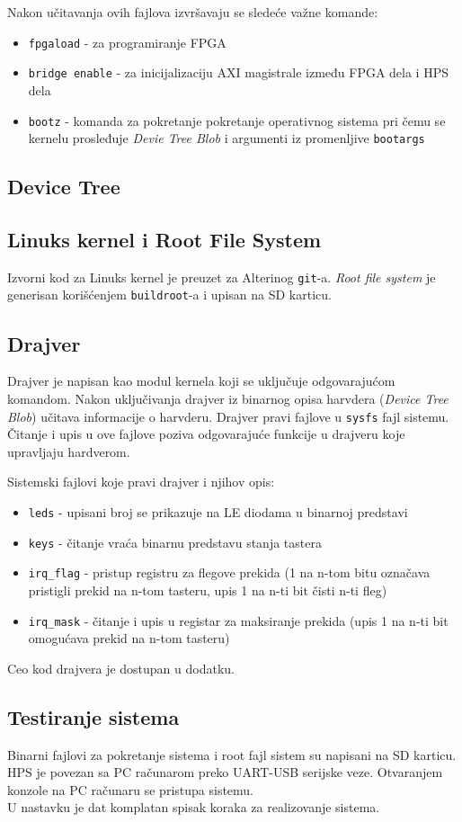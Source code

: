 Nakon učitavanja ovih fajlova izvršavaju se sledeće važne komande:
\begin{itemize}
\item \texttt{fpgaload} - za programiranje FPGA
\item \texttt{bridge enable} - za inicijalizaciju AXI magistrale između FPGA dela i HPS dela
\item \texttt{bootz} - komanda za pokretanje pokretanje operativnog sistema pri čemu se kernelu prosleđuje \textit{Devie Tree Blob} i argumenti iz promenljive \texttt{bootargs}
\end{itemize}

\subsection{Device Tree}

\subsection{Linuks kernel i Root File System}
Izvorni kod za Linuks kernel je preuzet za Alterinog \texttt{git}-a. \textit{Root file system} je generisan korišćenjem \texttt{buildroot}-a i upisan na SD karticu.

\subsection{Drajver}
Drajver je napisan kao modul kernela koji se uključuje odgovarajućom komandom. Nakon uključivanja drajver iz binarnog opisa harvdera (\textit{Device Tree Blob}) učitava informacije o harvderu. Drajver pravi fajlove u \texttt{sysfs} fajl sistemu. Čitanje i upis u ove fajlove poziva odgovarajuće funkcije u drajveru koje upravljaju hardverom.

Sistemski fajlovi koje pravi drajver i njihov opis:
\begin{itemize}
\item \texttt{leds} - upisani broj se prikazuje na LE diodama u binarnoj predstavi
\item \texttt{keys} - čitanje vraća binarnu predstavu stanja tastera
\item \texttt{irq\_flag} - pristup registru za flegove prekida (1 na n-tom bitu označava pristigli prekid na n-tom tasteru, upis 1 na n-ti bit čisti n-ti fleg)
\item \texttt{irq\_mask} - čitanje i upis u registar za maksiranje prekida (upis 1 na n-ti bit omogućava prekid na n-tom tasteru)
\end{itemize}

Ceo kod drajvera je dostupan u dodatku.
\subsection*{Testiranje sistema}
Binarni fajlovi za pokretanje sistema i root fajl sistem su napisani na SD karticu. HPS je povezan sa PC računarom preko UART-USB serijske veze. Otvaranjem konzole na PC računaru se pristupa sistemu.\\
U nastavku je dat komplatan spisak koraka za realizovanje sistema.



